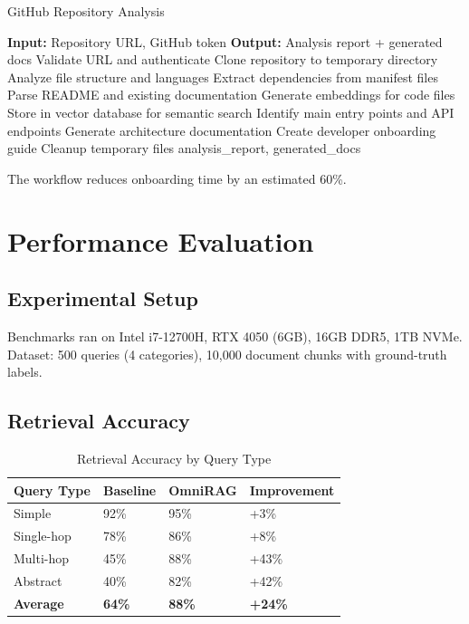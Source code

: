 \documentclass[conference]{IEEEtran}
\begin{document}
\begin{algorithm}[htbp]
\caption{GitHub Repository Analysis}
\label{alg:github}
\begin{algorithmic}[1]
\STATE \textbf{Input:} Repository URL, GitHub token
\STATE \textbf{Output:} Analysis report + generated docs
\STATE
\STATE Validate URL and authenticate
\STATE Clone repository to temporary directory
\STATE
\STATE Analyze file structure and languages
\STATE Extract dependencies from manifest files
\STATE Parse README and existing documentation
\STATE
\STATE Generate embeddings for code files
\STATE Store in vector database for semantic search
\STATE
\STATE Identify main entry points and API endpoints
\STATE Generate architecture documentation
\STATE Create developer onboarding guide
\STATE
\STATE Cleanup temporary files
\RETURN analysis\_report, generated\_docs
\end{algorithmic}
\end{algorithm}

The workflow reduces onboarding time by an estimated 60\%.

\section{Performance Evaluation}

\subsection{Experimental Setup}
Benchmarks ran on Intel i7-12700H, RTX 4050 (6GB), 16GB DDR5, 1TB NVMe. Dataset: 500 queries (4 categories), 10,000 document chunks with ground-truth labels.

\subsection{Retrieval Accuracy}

\begin{table}[htbp]
\caption{Retrieval Accuracy by Query Type}
\begin{center}
\begin{tabularx}{\linewidth}{|l|Y|Y|Y|}
\hline
\textbf{Query Type} & \textbf{Baseline} & \textbf{OmniRAG} & \textbf{Improvement} \\
\hline
Simple & 92\% & 95\% & +3\% \\
Single-hop & 78\% & 86\% & +8\% \\
Multi-hop & 45\% & 88\% & +43\% \\
Abstract & 40\% & 82\% & +42\% \\
\hline
\textbf{Average} & \textbf{64\%} & \textbf{88\%} & \textbf{+24\%} \\
\hline
\end{tabularx}
\label{tab:accuracy}
\end{center}
\end{table}
\end{document}

